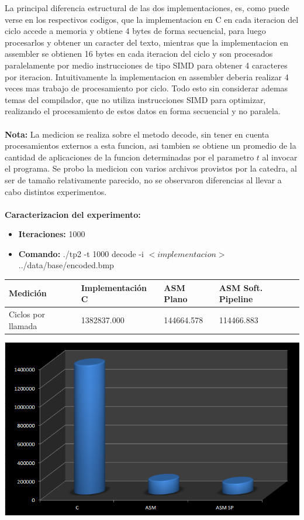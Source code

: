 La principal diferencia estructural de las dos implementaciones, es, como puede verse en los respectivos codigos, que la
implementacion en C en cada iteracion del ciclo accede a memoria y obtiene 4 bytes de forma secuencial, para luego procesarlos y obtener un caracter del texto, mientras que la implementacion en assembler se obtienen 16 bytes en cada iteracion del ciclo y son procesados paralelamente por medio instrucciones de tipo SIMD para obtener 4 caracteres por iteracion. Intuitivamente la implementacion en assembler deberia realizar 4 veces mas trabajo de procesamiento por ciclo. Todo esto sin considerar ademas temas del compilador, que no utiliza instrucciones SIMD para optimizar, realizando el procesamiento de estos datos  en forma secuencial y no paralela. \\
\\
\textbf{Nota:} La medicion se realiza sobre el metodo decode, sin tener en cuenta procesamientos externos a esta funcion, asi tambien se obtiene un promedio de la cantidad de aplicaciones de la funcion determinadas por el parametro $t$ al invocar el programa. Se probo la medicion con varios archivos provistos por la catedra, al ser de tamaño relativamente parecido, no se observaron diferencias al llevar a cabo distintos experimentos.
\\
\\
\textbf{Caracterizacion del experimento:}
\begin{itemize}
    \item \textbf{Iteraciones:} 1000
    \item \textbf{Comando:} ./tp2 -t 1000 decode -i $<implementacion>$ ../data/base/encoded.bmp 
\end{itemize}

\begin{center}
    \begin{tabular}{|l|l|l|l|}
        \hline
        Medición & Implementación C & ASM Plano & ASM Soft. Pipeline   \\
        \hline
        Ciclos por llamada &    1382837.000   & 144664.578       & 114466.883  \\
        \hline
    \end{tabular}
\end{center}
\includegraphics[scale=0.85]{imagenes/decode-resultados.png} 
\par
\bigskip
